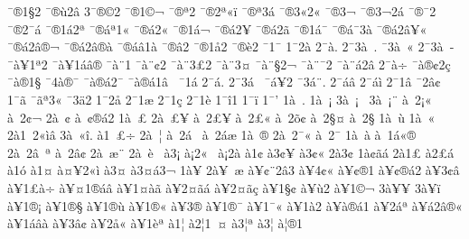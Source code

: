 {^^af^^ae1^^a72
^^af^^ae^^f92^^e2
3^^af^^ae^^a92
^^af^^ae1^^a9^^ac
^^af^^ae^^aa2
^^af^^ae2^^aa^^ab^^ef
^^af^^ae^^aa3^^e1
^^af^^ae3^^ab2^^ab
^^af^^ae3^^ac^^ad
^^af^^ae3^^ac2^^e1
^^af^^ae^^af2
^^af^^ae2^^af^^e1
^^af^^ae1^^e12^^aa
^^af^^ae^^e1^^aa1^^ab
^^af^^ae^^e12^^ab
^^af^^ae1^^e1^^ac
^^af^^ae^^e12^^ad^^a5
^^af^^ae^^e12^^ad^^e3
^^af^^ae1^^e1^^af
^^af^^ae^^e1^^af3^^e0
^^af^^ae^^e12^^e2^^a5^^ab
^^af^^ae^^e12^^e2^^ae^^ac
^^af^^ae^^e12^^e2^^ae^^e0
^^af^^ae^^e1^^e21^^e0
^^af^^ae^^e22
^^af^^ae1^^e52
^^af^^ae^^e82
^^af1^^af
1^^af2^^e0
2^^af^^e0.
2^^af3^^e0^^a0.
^^af3^^e0^^a0^^ab
2^^af3^^e0^^a0^^ad
^^af^^e0^^a51^^aa2
^^af^^e0^^a51^^e1^^e2^^ae
^^af^^e0^^a81
^^af^^e0^^a8^^a22
^^af^^e0^^a83^^a32
^^af^^e0^^a83^^a4
^^af^^e0^^a8^^a72^^ac
^^af^^e0^^a8^^af2
^^af^^e0^^a8^^e12^^e2
2^^af^^e0^^f7
^^af^^e0^^ae^^a22^^e7
^^af^^e0^^ae1^^a7
^^af4^^e0^^ae^^af
^^af^^e0^^ae^^e12^^af
^^af^^e0^^ae^^e11^^e2^^a0
^^af1^^e1
2^^af^^e1.
2^^af3^^e1^^a0
^^af^^e1^^a52
^^af3^^e1^^a8.
2^^af^^e1^^e2
2^^af^^e1^^ec
2^^af1^^e2
^^af2^^e2^^a2
1^^af^^e3
^^af^^e3^^aa3^^ab
^^af3^^e42
1^^af2^^e5
2^^af1^^e6
2^^af1^^e7
2^^af1^^e8
1^^af^^ee1
1^^af^^ef
1^^af'
1^^e0^^a0.
1^^e0^^a0^^a1
3^^e0^^a0^^a1^^a0
3^^e0^^a0^^a1^^a8
^^e0^^a02^^a1^^ab
^^e0^^a02^^a2^^ac
2^^e0^^a0^^a2^^ad
^^e0^^a0^^a2^^ae^^e12
1^^e0^^a0^^a3
2^^e0^^a0^^a3^^a5
^^e0^^a02^^a3^^a5^^ad
^^e0^^a02^^a3^^ab
^^e0^^a02^^f5^^a2
^^e0^^a02^^a7^^a4
^^e0^^a02^^a7^^ad
1^^e0^^a0^^f9
1^^e0^^a0^^ab
2^^e01^^a02^^ab^^ec^^e2
3^^e0^^a0^^ab^^ee.
^^e01^^a0^^ad^^a3^^f7
2^^e0^^a0^^ad^^a6
^^e0^^a0^^ad2^^e1^^a0
^^e0^^a0^^ad2^^e1^^e6
1^^e0^^a0^^ae
2^^e0^^a02^^af^^ab
^^e0^^a02^^af^^ad
1^^e0^^a0^^e0
^^e0^^a01^^e1^^ab^^ae
2^^e0^^a02^^e2^^a0^^aa
^^e0^^a02^^e2^^a2
2^^e0^^a0^^e6^^a8
2^^e0^^a0^^e8^^a0
^^e03^^a1
^^e0^^a12^^ab^^a0
^^e0^^a12^^e0
^^e01^^a2
^^e03^^a2^^a5^^ad
^^e03^^a2^^ab
2^^e03^^a2^^ad
1^^e0^^a2^^e3^^e1
2^^e01^^a3
^^e02^^a3^^e1
^^e01^^f3
^^e01^^a4
^^e0^^a4^^a52^^ab^^ec
^^e03^^a4^^ad
^^e03^^a4^^e13^^ac
1^^e0^^a5
2^^e0^^a5^^a0^^e6
^^e0^^a5^^a2^^a82^^e23
^^e0^^a54^^a2^^ab
^^e0^^a5^^a2^^ae1
^^e0^^a5^^a2^^ae^^e12
^^e0^^a53^^a2^^e2
^^e0^^a51^^a3^^e0^^f7
^^e0^^a5^^a41^^ae^^e1^^e2
^^e0^^a51^^a4^^e0^^e3
^^e0^^a52^^a4^^e3^^e1
^^e0^^a52^^a4^^e3^^e7
^^e0^^a51^^a7^^a2
^^e0^^a5^^f92
^^e0^^a51^^a9^^ac
3^^e0^^a5^^ad^^a5
3^^e0^^a5^^ad^^ef
^^e0^^a51^^ae^^a1
^^e0^^a51^^ae^^a7
^^e0^^a51^^ae^^f9
^^e0^^a51^^ae^^ab
^^e0^^a53^^ae^^ad
^^e0^^a51^^ae^^af
^^e0^^a51^^af^^ab
^^e0^^a51^^e02
^^e0^^a5^^e0^^ae^^e11
^^e0^^a52^^e1^^aa
^^e0^^a5^^e12^^e2^^ae^^ab
^^e0^^a51^^e1^^e2^^e0
^^e0^^a53^^e2^^a2
^^e0^^a52^^e5^^ab
^^e0^^a51^^e8^^aa
^^e01^^a6
^^e02^^a61^^a0^^a4
^^e03^^a6^^aa
^^e03^^a6^^ad
^^e0^^a6^^ae1
}
